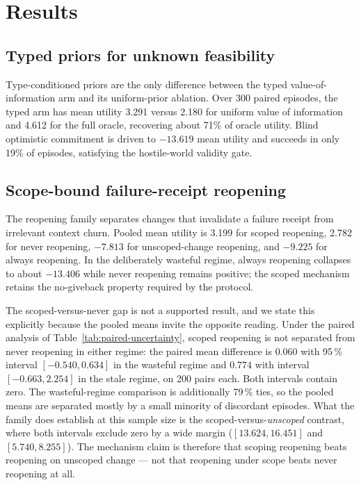 \section{Results}

\subsection{Typed priors for unknown feasibility}
Type-conditioned priors are the only difference between the typed value-of-information arm and its uniform-prior ablation. Over 300 paired episodes, the typed arm has mean utility 3.291 versus 2.180 for uniform value of information and 4.612 for the full oracle, recovering about 71\% of oracle utility. Blind optimistic commitment is driven to $-13.619$ mean utility and succeeds in only 19\% of episodes, satisfying the hostile-world validity gate.

\subsection{Scope-bound failure-receipt reopening}
The reopening family separates changes that invalidate a failure receipt from irrelevant context churn. Pooled mean utility is 3.199 for scoped reopening, 2.782 for never reopening, $-7.813$ for unscoped-change reopening, and $-9.225$ for always reopening. In the deliberately wasteful regime, always reopening collapses to about $-13.406$ while never reopening remains positive; the scoped mechanism retains the no-giveback property required by the protocol.

The scoped-versus-never gap is not a supported result, and we state this explicitly because the pooled means invite the opposite reading. Under the paired analysis of Table~\ref{tab:paired-uncertainty}, scoped reopening is not separated from never reopening in either regime: the paired mean difference is $0.060$ with 95\,\% interval $[-0.540, 0.634]$ in the wasteful regime and $0.774$ with interval $[-0.663, 2.254]$ in the stale regime, on 200 pairs each. Both intervals contain zero. The wasteful-regime comparison is additionally 79\,\% ties, so the pooled means are separated mostly by a small minority of discordant episodes. What the family does establish at this sample size is the scoped-versus-\emph{unscoped} contrast, where both intervals exclude zero by a wide margin ($[13.624, 16.451]$ and $[5.740, 8.255]$). The mechanism claim is therefore that scoping reopening beats reopening on unscoped change --- not that reopening under scope beats never reopening at all.

